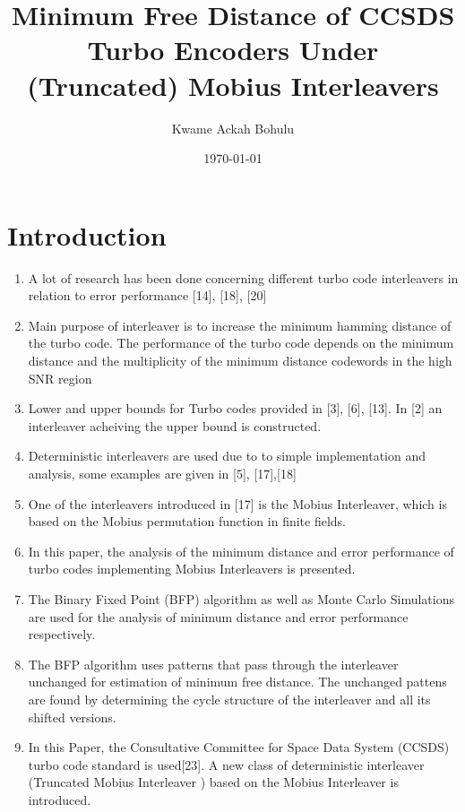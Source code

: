 \documentclass[fontsize=12pt]{article}
\title{Minimum Free Distance of CCSDS Turbo Encoders
Under (Truncated) Mobius Interleavers}
\author{Kwame Ackah Bohulu}
\date{\today}
\begin{document}
\maketitle

\newpage


\section{Introduction}
\begin{enumerate}
\item A lot of research has been done concerning different turbo code interleavers in relation to error performance [14], [18], [20]

\item Main purpose of interleaver is to increase the minimum hamming distance of the turbo code. The performance of the turbo code depends on the minimum distance and the multiplicity of the minimum distance codewords in the high SNR region

\item Lower and upper bounds for Turbo codes provided in [3], [6], [13]. In [2] an interleaver acheiving the upper bound is constructed.

\item Deterministic interleavers are used due to to simple implementation and analysis, some examples are given in [5], [17],[18]

\item One of the interleavers introduced in [17] is the Mobius Interleaver, which is based on the Mobius permutation function in finite fields. 

\item In this paper, the analysis of the minimum distance and error performance of turbo codes implementing Mobius Interleavers is presented.

\item The Binary Fixed Point (BFP) algorithm as well as Monte Carlo Simulations are used for the analysis of minimum distance and error performance respectively.

\item The BFP algorithm uses patterns that pass through the interleaver unchanged for estimation of minimum free distance. The unchanged pattens are found by determining the cycle structure of the interleaver and all its shifted versions.

\item In this Paper, the Consultative Committee for Space Data System (CCSDS) turbo code standard is used[23]. A new class of deterministic interleaver (Truncated Mobius Interleaver ) based on the Mobius Interleaver is introduced. 


\end{enumerate}
\end{document}
